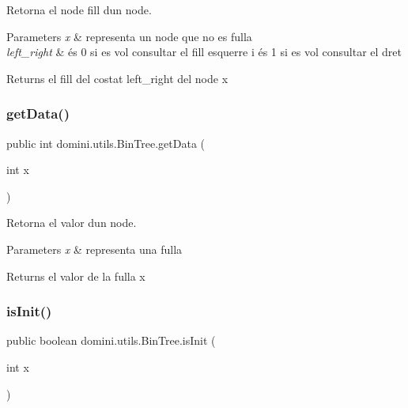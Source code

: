 Retorna el node fill d\textquotesingle{}un node. 


\begin{DoxyParams}{Parameters}
{\em x} & representa un node que no es fulla \\
\hline
{\em left\+\_\+right} & és 0 si es vol consultar el fill esquerre i és 1 si es vol consultar el dret \\
\hline
\end{DoxyParams}
\begin{DoxyReturn}{Returns}
el fill del costat left\+\_\+right del node x 
\end{DoxyReturn}
\mbox{\label{classdomini_1_1utils_1_1BinTree_ad8734786aa8ba40815e4b782264aef64}} 
\subsubsection{\texorpdfstring{get\+Data()}{getData()}}
{\footnotesize\ttfamily public int domini.\+utils.\+Bin\+Tree.\+get\+Data (\begin{DoxyParamCaption}\item[{int}]{x }\end{DoxyParamCaption})\hspace{0.3cm}{\ttfamily [inline]}}



Retorna el valor d\textquotesingle{}un node. 


\begin{DoxyParams}{Parameters}
{\em x} & representa una fulla \\
\hline
\end{DoxyParams}
\begin{DoxyReturn}{Returns}
el valor de la fulla x 
\end{DoxyReturn}
\mbox{\label{classdomini_1_1utils_1_1BinTree_aefcc4df5059f9893eba9998cb267eced}} 
\subsubsection{\texorpdfstring{is\+Init()}{isInit()}}
{\footnotesize\ttfamily public boolean domini.\+utils.\+Bin\+Tree.\+is\+Init (\begin{DoxyParamCaption}\item[{int}]{x }\end{DoxyParamCaption})\hspace{0.3cm}{\ttfamily [inline]}}



